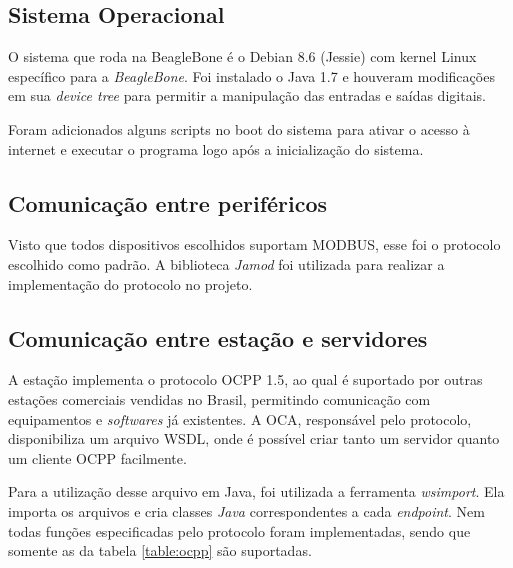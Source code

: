     \subsection{Sistema Operacional}

      O sistema que roda na BeagleBone é o Debian 8.6 (Jessie) com kernel Linux específico para a \textit{BeagleBone}. Foi instalado o Java 1.7 e houveram modificações em sua \textit{device tree} para permitir a manipulação das entradas e saídas digitais.

      Foram adicionados alguns scripts no boot do sistema para ativar o acesso à internet e executar o programa logo após a inicialização do sistema.

    \subsection{Comunicação entre periféricos}

      Visto que todos dispositivos escolhidos suportam MODBUS, esse foi o protocolo escolhido como padrão. A biblioteca \textit{Jamod} foi utilizada para realizar a implementação do protocolo no projeto.

    \subsection{Comunicação entre estação e servidores}

      A estação implementa o protocolo \ac{OCPP} 1.5, ao qual é suportado por outras estações comerciais vendidas no Brasil, permitindo comunicação com equipamentos e \textit{softwares} já existentes. A \ac{OCA}, responsável pelo protocolo, disponibiliza um arquivo WSDL, onde é possível criar tanto um servidor quanto um cliente OCPP facilmente.

      Para a utilização desse arquivo em Java, foi utilizada a ferramenta \textit{wsimport}. Ela importa os arquivos e cria classes \textit{Java} correspondentes a cada \textit{endpoint}. Nem todas funções especificadas pelo protocolo foram implementadas, sendo que somente as da tabela \ref{table:ocpp} são suportadas.

